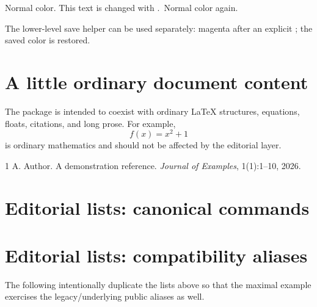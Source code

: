 \documentclass[11pt]{article}
\begin{document}
Normal color. This text is changed with
\texttt{\string\cwcolor}.\cwrestorecolor\ Normal color again.

The lower-level save helper can be used separately:
\cwsavecolor
\color{magenta}magenta after an explicit \texttt{\string\color};
\cwrestorecolor
the saved color is restored.

\section{A little ordinary document content}

The package is intended to coexist with ordinary LaTeX structures, equations,
floats, citations, and long prose. For example,
\[
  f(x)=x^2+1
\]
is ordinary mathematics and should not be affected by the editorial layer.

\lipsum[2]

\begin{thebibliography}{1}
A. Author.
\newblock A demonstration reference.
\newblock \emph{Journal of Examples}, 1(1):1--10, 2026.
\end{thebibliography}

\clearpage
\section*{Editorial lists: canonical commands}

\listofcomments
\listofcitationneeds
\listofsubjects

\clearpage
\section*{Editorial lists: compatibility aliases}

The following intentionally duplicate the lists above so that the maximal
example exercises the legacy/underlying public aliases as well.

\listofcomentario
\listofcomentarioref
\listofsubject
\listofassunto
\end{document}
